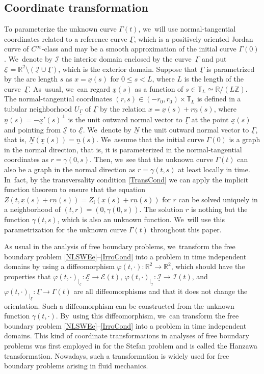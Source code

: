 \documentclass[11pt]{article}
\newcommand{\R}{{\mathbb R}}
\newcommand{\cI}{{\mathcal I}}
\newcommand{\cE}{{\mathcal E}}
\newcommand{\ul}[1]{\underline{#1}}
\newcommand{\itGamma}{\mathit{\Gamma}}
\theoremstyle{definition}
\begin{document}
\subsection{Coordinate transformation}\label{subsect:CT}
To parameterize the unknown curve $\itGamma(t)$, we~will use normal-tangential coordinates related to a reference curve $\ul{\itGamma}$,
which is a positively oriented Jordan curve of $C^\infty$-class and may be a smooth approximation of the initial curve $\itGamma(0)$. We~denote by $\ul{\cI}$ the interior domain enclosed by the curve~$\ul{\itGamma}$ and put $\ul{\cE}=\R^2\setminus(\ul{\cI}\cup\ul{\itGamma})$,
which is the exterior domain.
Suppose that $\ul{\itGamma}$ is parametrized by the arc length $s$ as $x = \ul{x}(s)$ for $0\leq s<L$, where $L$ is the length of the curve~$\ul{\itGamma}$. As~usual, we~can regard $\ul{x}(s)$ as a function of $s \in \mathbb{T}_L \simeq \R/(L\mathbb{Z})$.
The normal-tangential coordinates $(r,s)\in(-r_0,r_0)\times\mathbb{T}_L$ is defined in a tubular neighborhood $U_{\ul{\itGamma}}$ of $\ul{\itGamma}$
by the relation $x=\ul{x}(s)+r\ul{n}(s)$,
where $\ul{n}(s)=-\ul{x}'(s)^\perp$ is the unit outward normal vector to $\ul{\itGamma}$ at the point $\ul{x}(s)$ and pointing from $\ul{\cI}$ to $\ul{\cE}$. We~denote by $\ul{N}$ the unit outward normal vector to $\ul{\itGamma}$, that is, $\ul{N}(\ul{x}(s))=\ul{n}(s)$. We~assume that the initial curve $\itGamma(0)$ is a graph in the normal direction, that is,
it is parameterized in the normal-tangential coordinates as $r=\gamma(0,s)$.
Then, we~see that the unknown curve $\itGamma(t)$ can also be a graph in the normal direction as $r=\gamma(t,s)$ at least locally in time. In~fact, by the transversality condition \eqref{TransCond} we can apply the implicit function theorem to ensure that the equation
$Z(t,\ul{x}(s)+r\ul{n}(s)) = Z_\mathrm{i}(\ul{x}(s)+r\ul{n}(s))$ for $r$ can be solved uniquely in a neighborhood of $(t,r)=(0,\gamma(0,s))$.
The solution $r$ is nothing but the function $\gamma(t,s)$, which is also an unknown function. We~will use this parametrization for the unknown curve $\itGamma(t)$ throughout this paper.

As usual in the analysis of free boundary problems, we~transform the free boundary problem \eqref{NLSWEe}--\eqref{IrroCond} into a problem
in time independent domains by using a diffeomorphism $\varphi(t,\cdot):\R^2\to\R^2$, which should have the properties that
$\varphi(t,\cdot)_{\vert_{\ul{\cE}}} : \ul{\cE}\to \cE(t)$, $\varphi(t,\cdot)_{\vert_{\ul{\cI}}} : \ul{\cI}\to \cI(t)$,
and $\varphi(t,\cdot)_{\vert_{\ul{\itGamma}}} : \ul{\itGamma}\to \itGamma(t)$ are all diffeomorphisms and that it does not change the orientation.
Such a diffeomorphism can be constructed from the unknown function $\gamma(t,\cdot)$. By~using this diffeomorphism, we~can transform the free boundary problem \eqref{NLSWEe}--\eqref{IrroCond} into a problem in time independent domains.
This kind of coordinate transformations in analyses of free boundary problems was first employed in \cite{Hanzawa1981} for the Stefan problem
and is called the Hanzawa transformation.
Nowadays, such a transformation is widely used for free boundary problems arising in fluid mechanics.
\end{document}
